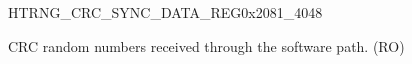 \begin{register}{H}{TRNG\_CRC\_SYNC\_DATA\_REG}{0x2081\_4048}\label{regdesc:TRNGCRCSYNCDATAREG}
%
\regnewline%
\begin{regdesc}\begin{reglist}

\label{fielddesc:TRNGSWCRCRANDOMDATASYNC}\item [TRNG\_SW\_CRC\_RANDOM\_DATA\_SYNC] CRC random numbers received through the software path. (RO)


\end{reglist}\end{regdesc}
\end{register}
